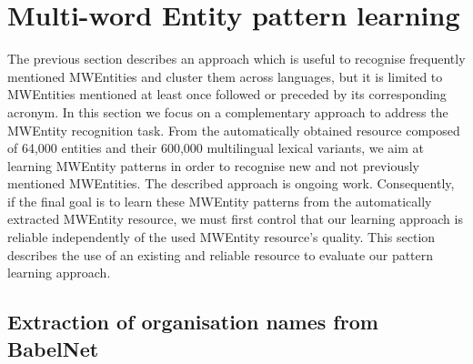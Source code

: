 \documentclass[output=paper]{langsci/langscibook}
\begin{document}
\section{Multi-word Entity pattern learning}

The previous section describes an approach which is useful to recognise frequently mentioned MWEntities and cluster them across languages, but it is limited to MWEntities mentioned at least once followed or preceded by its corresponding acronym. In this section we focus on a complementary approach to address the MWEntity recognition task. From the automatically obtained resource composed of 64,000 entities and their 600,000 multilingual lexical variants, we aim at learning MWEntity patterns in order to recognise new and not previously mentioned MWEntities. The described approach is ongoing work. Consequently, if the final goal is to learn these MWEntity patterns from the automatically extracted MWEntity resource, we must first control that our learning approach is reliable independently of the used MWEntity resource's quality. This section describes the use of an existing and reliable resource to evaluate our pattern learning approach.

\subsection{Extraction of organisation names from BabelNet}
\label{sec:babelnet}
\end{document}
